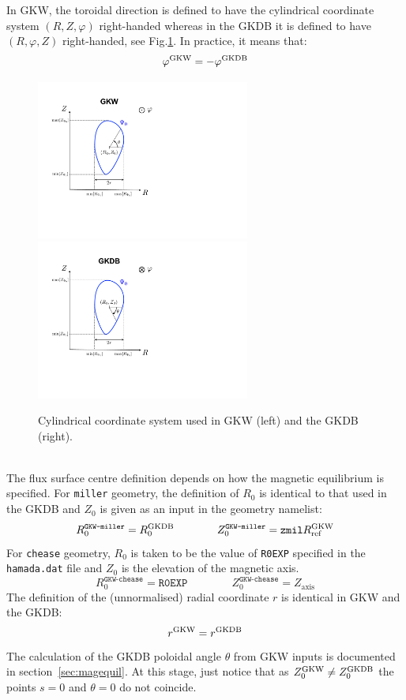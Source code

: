 \documentclass[a4paper]{report}
\begin{document}
In GKW, the toroidal direction is defined to have the cylindrical coordinate system $(R,Z,\varphi)$ right-handed whereas in the GKDB it is defined to have $(R,\varphi,Z)$ right-handed, see Fig.\ref{fig:coord1}. In practice, it means that: 
\begin{equation}
\varphi^{\textrm{GKW}}=-\varphi^{\textrm{GKDB}}
\end{equation}
\begin{figure}[h]
	\begin{center}
		\includegraphics[width=7cm]{GKW_coord.pdf}
		\includegraphics[width=7cm]{GKDB_coord.pdf}
		\caption{\label{fig:coord1} Cylindrical coordinate system used in GKW (left) and the GKDB (right).}
	\end{center}
\end{figure}\\
The flux surface centre definition depends on how the magnetic equilibrium is specified. For \texttt{miller} geometry, the definition of $R_0$ is identical to that used in the GKDB and $Z_0$ is given as an input in the geometry namelist:
\begin{equation}
R_0^\texttt{GKW-miller} = R_0^{\textrm{GKDB}} \qquad \qquad Z_0^\texttt{GKW-miller} = \texttt{zmil}R_{\textrm{ref}}^{\textrm{GKW}}
\end{equation}
For \texttt{chease} geometry, $R_0$ is taken to be the value of \texttt{R0EXP} specified in the \texttt{hamada.dat} file and $Z_0$ is the elevation of the magnetic axis.
\begin{equation}
R_0^\texttt{GKW-chease} = \texttt{R0EXP} \qquad \qquad Z_0^\texttt{GKW-chease} = Z_\textrm{axis}
\end{equation}
The definition of the (unnormalised) radial coordinate $r$ is identical in GKW and the GKDB:
\begin{equation}
r^{\textrm{GKW}} = r^{\textrm{GKDB}}
\end{equation}
The calculation of the GKDB poloidal angle $\theta$ from GKW inputs is documented in section~\ref{sec:magequil}. At this stage, just notice that as  $Z_0^{\textrm{GKW}}\neq Z_0^{\textrm{GKDB}}$ the points $s=0$ and $\theta=0$ do not  coincide. 
\end{document}
